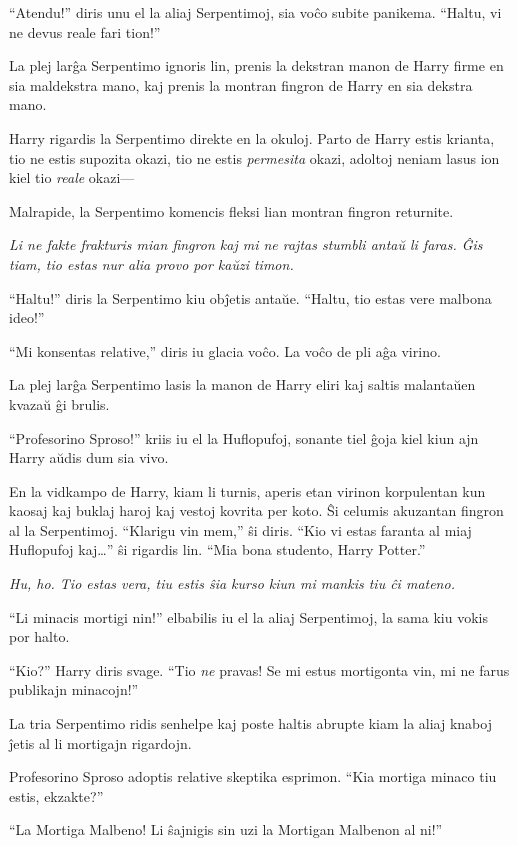 ``Atendu!'' diris unu el la aliaj Serpentimoj, sia voĉo subite
panikema. ``Haltu, vi ne devus reale fari tion!''

La plej larĝa Serpentimo ignoris lin, prenis la dekstran manon de Harry
firme en sia maldekstra mano, kaj prenis la montran fingron de Harry
en sia dekstra mano.

Harry rigardis la Serpentimo direkte en la okuloj. Parto de Harry
estis krianta, tio ne estis supozita okazi, tio ne estis \emph{permesita}
okazi, adoltoj neniam lasus ion kiel tio \emph{reale} okazi—

Malrapide, la Serpentimo komencis fleksi lian montran fingron returnite.

\emph{Li ne fakte frakturis mian fingron kaj mi ne rajtas stumbli antaŭ
li faras. Ĝis tiam, tio estas nur alia provo por kaŭzi timon. }

``Haltu!'' diris la Serpentimo kiu obĵetis antaŭe. ``Haltu, tio estas
vere malbona ideo!''

``Mi konsentas relative,'' diris iu glacia voĉo. La voĉo de pli aĝa virino.

La plej larĝa Serpentimo lasis la manon de Harry eliri kaj saltis
malantaŭen kvazaŭ ĝi brulis.

``Profesorino Sproso!'' kriis iu el la Huflopufoj, sonante tiel ĝoja
kiel kiun ajn Harry aŭdis dum sia vivo.

En la vidkampo de Harry, kiam li turnis, aperis etan virinon
korpulentan kun kaosaj kaj buklaj haroj kaj vestoj kovrita per
koto. Ŝi celumis akuzantan fingron al la Serpentimoj. ``Klarigu vin
mem,'' ŝi diris. ``Kio vi estas faranta al miaj Huflopufoj kaj\ldots''
ŝi rigardis lin. ``Mia bona studento, Harry Potter.''

\emph{Hu, ho. Tio estas vera, tiu estis ŝia kurso kiun mi mankis tiu ĉi mateno.}

``Li minacis mortigi nin!'' elbabilis iu el la aliaj Serpentimoj, la
sama kiu vokis por halto.

``Kio?'' Harry diris svage. ``Tio \emph{ne} pravas! Se mi estus
mortigonta vin, mi ne farus publikajn minacojn!''

La tria Serpentimo ridis senhelpe kaj poste haltis abrupte kiam la
aliaj knaboj ĵetis al li mortigajn rigardojn.

Profesorino Sproso adoptis relative skeptika esprimon. ``Kia mortiga
minaco tiu estis, ekzakte?''

``La Mortiga Malbeno! Li ŝajnigis sin uzi la Mortigan Malbenon al
ni!''

